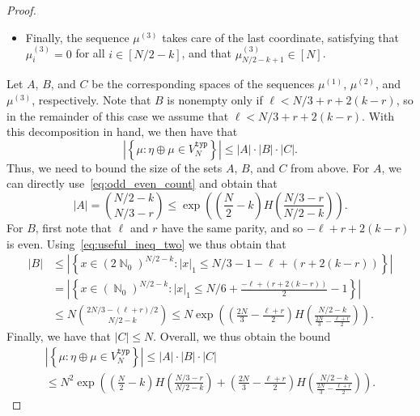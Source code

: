 \documentclass[11pt]{article}
\numberwithin{equation}{section}
\DeclareMathOperator{\N}{\mathbb{N}} %
\theoremstyle{definition}
\begin{document}
\begin{proof}
\begin{itemize}
\item Finally, the sequence $\mu^{(3)}$ takes care of the last coordinate, 
satisfying that 
$\mu^{(3)}_i = 0$ for all $i \in [N/2 - k]$, 
and that 
$\mu^{(3)}_{N/2 - k + 1} \in [N]$. 
\end{itemize}
Let $A$, $B$, and $C$ be the corresponding spaces of the sequences $\mu^{(1)}$, $\mu^{(2)}$, and $\mu^{(3)}$, respectively. 
Note that $B$ is nonempty only if 
$\ell < N/3 + r + 2(k-r)$, 
so in the remainder of this case we assume that 
$\ell < N/3 + r + 2(k-r)$. 
With this decomposition in hand, we then have that 
\begin{equation*}
    \left| \left\{\mu : \eta \oplus \mu \in V_{N}^{\mathtt{typ}} \right\} \right| \leq |A|\cdot |B| \cdot |C| .  
\end{equation*}
Thus, we need to bound the size of the sets $A$, $B$, and $C$ from above. 
For $A$, we can directly use~\eqref{eq:odd_even_count} and obtain that 
\[
|A| 
= \binom{N/2 - k}{N/3 - r}
\leq \exp \left( \left( \frac{N}{2} - k \right) H \left( \frac{N/3-r}{N/2-k} \right) \right).
\]
For $B$, first note that $\ell$ and $r$ have the same parity, and so $-\ell + r + 2(k-r)$ is even. 
Using~\eqref{eq:useful_ineq_two} we thus obtain that
\begin{align*}
    |B| &\leq \left| \left\{ x \in (2\N_{0})^{N/2 - k} : |x|_1 \leq N/3 - 1 - \ell + (r + 2(k-r)) \right\} \right|
    \\
    &
    =
    \left| \left\{ x \in (\N_{0})^{N/2 - k} : |x|_1  \leq N/6+\frac{- \ell + (r + 2(k-r))}{2} - 1 \right\} \right|
    \\
    &
    \leq N \binom{2N/3 - (\ell + r)/2}{N/2 - k}
    \leq 
    N
    \exp \left( \left( \frac{2N}{3} - \frac{\ell + r}{2} \right) H \left( \frac{N/2 - k}{\frac{2N}{3} - \frac{\ell + r}{2}} \right) \right).
\end{align*} 
Finally, we have that $|C| \leq N$. 
Overall, we thus obtain the bound 
\begin{multline*}
\left| \left\{\mu :  \eta \oplus \mu \in V_{N}^{\mathtt{typ}} \right\} \right| 
\leq |A|\cdot |B| \cdot |C|  \\
\leq N^{2} \exp \left( \left( \frac{N}{2} - k \right) H \left( \frac{N/3-r}{N/2-k} \right) 
+ \left( \frac{2N}{3}  -  \frac{\ell + r}{2}  \right) H \left( \frac{N/2 - k}{\frac{2N}{3} -  \frac{\ell + r}{2}} \right)  \right).
\end{multline*}



\end{proof}
\end{document}
